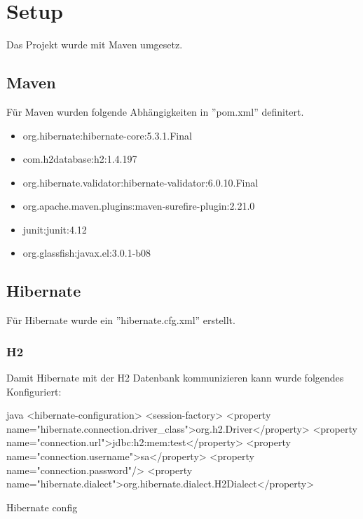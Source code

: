 	\section{Setup}
	
	Das Projekt wurde mit Maven umgesetz.
	
	\subsection{Maven}
	
	Für Maven wurden folgende Abhängigkeiten in  ''pom.xml'' definitert.
	
	\begin{itemize}
		\item org.hibernate:hibernate-core:5.3.1.Final
		\item com.h2database:h2:1.4.197
		\item org.hibernate.validator:hibernate-validator:6.0.10.Final
		\item org.apache.maven.plugins:maven-surefire-plugin:2.21.0
		\item junit:junit:4.12
		\item org.glassfish:javax.el:3.0.1-b08
	\end{itemize}

	\subsection{Hibernate}
	
	Für Hibernate wurde ein ''hibernate.cfg.xml'' erstellt. 
	
	\subsubsection{H2}
	
	Damit Hibernate mit der H2 Datenbank kommunizieren kann wurde folgendes Konfiguriert:
	
	\begin{listing}
	\begin{code}[]{java}
		<hibernate-configuration>
		<session-factory>
		<property name="hibernate.connection.driver_class">org.h2.Driver</property>
		<property name="connection.url">jdbc:h2:mem:test</property>
		<property name="connection.username">sa</property>
		<property name="connection.password"/>
		<property name="hibernate.dialect">org.hibernate.dialect.H2Dialect</property>
	\end{code}
	\caption{Hibernate config}
	\end{listing}
	
